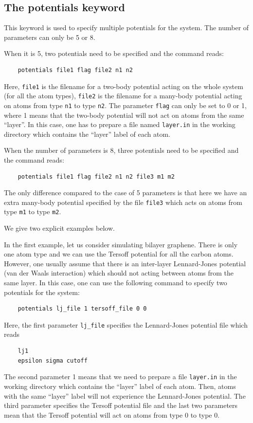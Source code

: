 \documentclass[12pt,a4paper]{report}
\begin{document}
\subsection{The potentials keyword}

This keyword is used to specify multiple potentials for the system. The number of parameters can only be 5 or 8. 

When it is 5, two potentials need to be specified and the command reads:
\begin{verbatim}
    potentials file1 flag file2 n1 n2
\end{verbatim}
Here, \verb"file1" is the filename for a two-body potential acting on the whole system (for all the atom types), \verb"file2" is the filename for a many-body potential acting on atoms from type \verb"n1" to type \verb"n2". The parameter \verb"flag" can only be set to 0 or 1, where 1 means that the two-body potential will not act on atoms from the same ``layer''. In this case, one has to prepare a file named \verb"layer.in" in the working directory which contains the ``layer'' label of each atom.

When the number of parameters is 8, three potentials need to be specified and the command reads:
\begin{verbatim}
    potentials file1 flag file2 n1 n2 file3 m1 m2
\end{verbatim}
The only difference compared to the case of 5 parameters is that here we have an extra many-body potential specified by the file \verb"file3" which acts on atoms from type \verb"m1" to type \verb"m2".

We give two explicit examples below.

In the first example, let us consider simulating bilayer graphene. There is only one atom type and we can use the Tersoff potential for all the carbon atoms. However, one usually assume that there is an inter-layer Lennard-Jones potential (van der Waals interaction) which should not acting between atoms from the same layer. In this case, one can use the following command to specify two potentials for the system:
\begin{verbatim}
    potentials lj_file 1 tersoff_file 0 0
\end{verbatim}
Here,  the first parameter \verb"lj_file" specifies the Lennard-Jones potential file which reads 
\begin{verbatim}
    lj1
    epsilon sigma cutoff
\end{verbatim}
The second parameter 1 means that we need to prepare a file \verb"layer.in" in the working directory which contains the ``layer'' label of each atom. Then, atoms with the same ``layer'' label will not experience the Lennard-Jones potential. The third parameter specifies the Tersoff potential file and the last two parameters mean that the Tersoff potential will act on atoms from type 0 to type 0.
\end{document}
